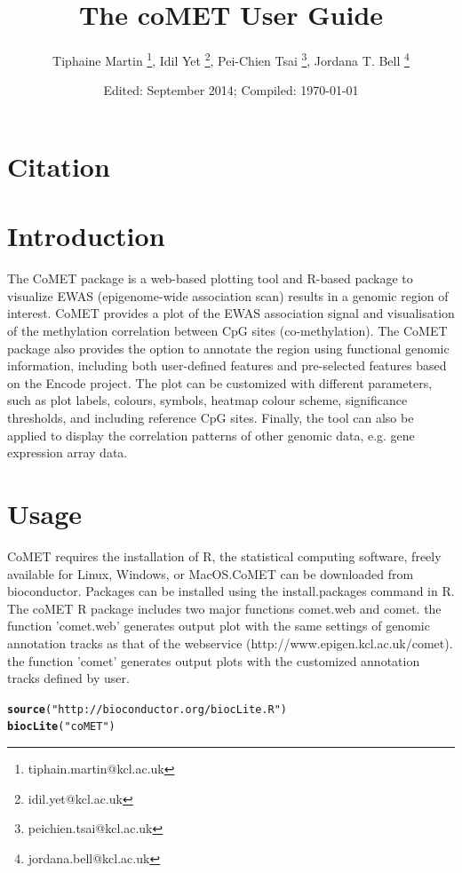 \documentclass[11pt]{article}\usepackage[]{graphicx}\usepackage[usenames,dvipsnames]{color}
\title{The coMET User Guide}
\author{Tiphaine Martin \footnote{tiphain.martin@kcl.ac.uk}, Idil Yet \footnote{idil.yet@kcl.ac.uk}, Pei-Chien Tsai \footnote{peichien.tsai@kcl.ac.uk}, Jordana T. Bell \footnote{jordana.bell@kcl.ac.uk}}
\date{Edited: September 2014; Compiled: \today}
\makeatletter
\newcommand{\hlstr}[1]{\textcolor[rgb]{0.192,0.494,0.8}{#1}}%
\newcommand{\hlstd}[1]{\textcolor[rgb]{0.345,0.345,0.345}{#1}}%
\newcommand{\hlkwd}[1]{\textcolor[rgb]{0.737,0.353,0.396}{\textbf{#1}}}%
\newenvironment{kframe}{%
 \def\at@end@of@kframe{}%
 \ifinner\ifhmode%
  \def\at@end@of@kframe{\end{minipage}}%
  \begin{minipage}{\columnwidth}%
 \fi\fi%
 \def\FrameCommand##1{\hskip\@totalleftmargin \hskip-\fboxsep
 \colorbox{shadecolor}{##1}\hskip-\fboxsep
     \hskip-\linewidth \hskip-\@totalleftmargin \hskip\columnwidth}%
 \MakeFramed {\advance\hsize-\width
   \@totalleftmargin\z@ \linewidth\hsize
   \@setminipage}}%
 {\par\unskip\endMakeFramed%
 \at@end@of@kframe}
\newenvironment{knitrout}{}{} %
\makeatother
\begin{document}
\maketitle

\section{Citation}
\clearpage

\tableofcontents
\clearpage

\section{Introduction}
The CoMET package is a web-based plotting tool and R-based package to visualize EWAS (epigenome-wide association scan) results in a genomic region of interest. CoMET provides a plot of the EWAS association signal and visualisation of the methylation correlation between CpG sites (co-methylation). The CoMET package also provides the option to annotate the region using functional genomic information, including both user-defined features and pre-selected features based on the Encode project. The plot can be customized with different parameters, such as plot labels, colours, symbols, heatmap colour scheme, significance thresholds, and including reference CpG sites. Finally, the tool can also be applied to display the correlation patterns of other genomic data, e.g. gene expression array data.


\section{Usage}
CoMET requires the installation of R, the statistical computing software, freely available for Linux, Windows, or MacOS.CoMET can be downloaded from bioconductor. Packages can be installed using the install.packages command in R.  The coMET R package includes two major functions comet.web and comet. the function ’comet.web’ generates output plot with the same settings of genomic annotation tracks as that of the webservice (http://www.epigen.kcl.ac.uk/comet). the function ’comet’ generates output plots with the customized annotation tracks defined by user. 

\begin{knitrout}
\color{fgcolor}\begin{kframe}
\begin{alltt}
\hlkwd{source}\hlstd{(}\hlstr{"http://bioconductor.org/biocLite.R"}\hlstd{)}
\hlkwd{biocLite}\hlstd{(}\hlstr{"coMET"}\hlstd{)}
\end{alltt}
\end{kframe}
\end{knitrout}
\end{document}
